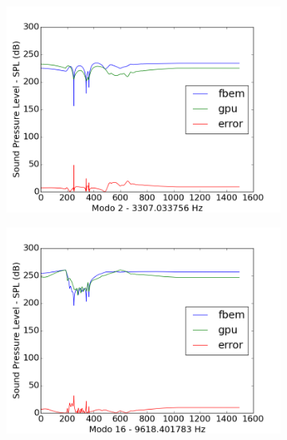 \begin{figure}[ht]
\begin{subfigure}{0.45\textwidth}
	\includegraphics[width=\textwidth]{../data/transfer_test/ceramic_mug/plots/ceramic_mug-tfv-0_2.png}
	\caption{}
	\label{fig:coef_mug_2}
\end{subfigure}
\begin{subfigure}{0.45\textwidth}
	\centering
	\includegraphics[width=\textwidth]{../data/transfer_test/ceramic_mug/plots/ceramic_mug-tfv-0_16.png}
	\caption{}
	\label{fig:coef_mug_16}
\end{subfigure}%
\begin{subfigure}{0.45\textwidth}
	\centering

\end{subfigure}
\end{figure}
